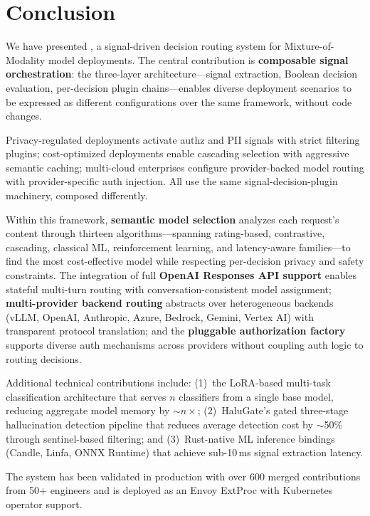 
\section{Conclusion}
\label{sec:conclusion}

We have presented \sysname{}, a signal-driven decision routing system for Mixture-of-Modality model deployments.
The central contribution is \textbf{composable signal orchestration}: the three-layer architecture---signal extraction, Boolean decision evaluation, per-decision plugin chains---enables diverse deployment scenarios to be expressed as different configurations over the same framework, without code changes.

Privacy-regulated deployments activate authz and PII signals with strict filtering plugins; cost-optimized deployments enable cascading selection with aggressive semantic caching; multi-cloud enterprises configure provider-backed model routing with provider-specific auth injection.
All use the same signal-decision-plugin machinery, composed differently.

Within this framework, \textbf{semantic model selection} analyzes each request's content through thirteen algorithms---spanning rating-based, contrastive, cascading, classical ML, reinforcement learning, and latency-aware families---to find the most cost-effective model while respecting per-decision privacy and safety constraints.
The integration of full \textbf{OpenAI Responses API support} enables stateful multi-turn routing with conversation-consistent model assignment; \textbf{multi-provider backend routing} abstracts over heterogeneous backends (vLLM, OpenAI, Anthropic, Azure, Bedrock, Gemini, Vertex AI) with transparent protocol translation; and the \textbf{pluggable authorization factory} supports diverse auth mechanisms across providers without coupling auth logic to routing decisions.

Additional technical contributions include:
(1)~the LoRA-based multi-task classification architecture that serves $n$ classifiers from a single base model, reducing aggregate model memory by $\sim$$n\times$;
(2)~HaluGate's gated three-stage hallucination detection pipeline that reduces average detection cost by $\sim$50\% through sentinel-based filtering; and
(3)~Rust-native ML inference bindings (Candle, Linfa, ONNX Runtime) that achieve sub-10\,ms signal extraction latency.

The system has been validated in production with over 600 merged contributions from 50+ engineers and is deployed as an Envoy ExtProc with Kubernetes operator support.

